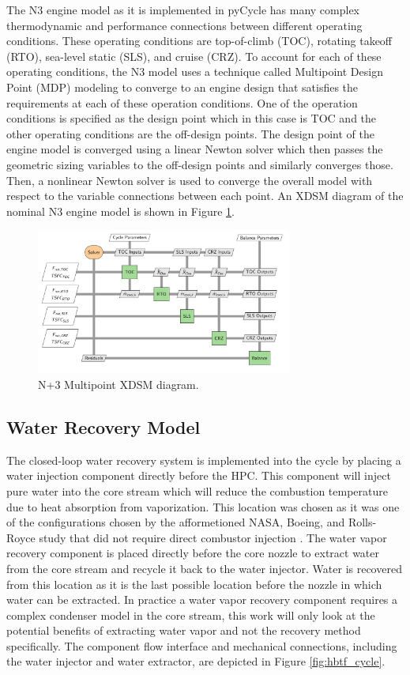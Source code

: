 \documentclass[12pt]{new-aiaa}
\begin{document}
\noindent
The N3 engine model as it is implemented in pyCycle has many complex thermodynamic and performance connections between different operating conditions.
These operating conditions are top-of-climb (TOC), rotating takeoff (RTO), sea-level static (SLS), and cruise (CRZ).
To account for each of these operating conditions, the N3 model uses a technique called Multipoint Design Point (MDP) modeling to converge to an engine design that satisfies the requirements at each of these operation conditions.
One of the operation conditions is specified as the design point which in this case is TOC and the other operating conditions are the off-design points.
The design point of the engine model is converged using a linear Newton solver which then passes the geometric sizing variables to the off-design points and similarly converges those.
Then, a nonlinear Newton solver is used to converge the overall model with respect to the variable connections between each point.
An XDSM diagram of the nominal N3 engine model is shown in Figure \ref{fig:N3_xdsm}.

\begin{figure}[!hbt]
    \centering
    \includegraphics[width=0.75\textwidth]{N3_xdsm.pdf}
    \caption{N+3 Multipoint XDSM diagram.}
    \label{fig:N3_xdsm}
\end{figure}

\subsection{Water Recovery Model}
The closed-loop water recovery system is implemented into the cycle by placing a water injection component directly before the HPC.
This component will inject pure water into the core stream which will reduce the combustion temperature due to heat absorption from vaporization.
This location was chosen as it was one of the configurations chosen by the afformetioned NASA, Boeing, and Rolls-Royce study that did not require direct combustor injection \cite{nasa_inject}.
The water vapor recovery component is placed directly before the core nozzle to extract water from the core stream and recycle it back to the water injector.
Water is recovered from this location as it is the last possible location before the nozzle in which water can be extracted.
In practice a water vapor recovery component requires a complex condenser model in the core stream, this work will only look at the potential benefits of extracting water vapor and not the recovery method specifically.
The component flow interface and mechanical connections, including the water injector and water extractor, are depicted in Figure \ref{fig:hbtf_cycle}.
\end{document}

